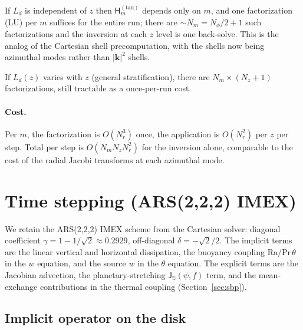 \documentclass[11pt]{article}
\newcommand{\Jsphere}{\mathsf{J}_{\mathbb{S}}}
\newcommand{\Ld}{L_d}
\newcommand{\Ra}{\mathrm{Ra}}
\newcommand{\Pr}{\mathrm{Pr}}
\begin{document}
If $\Ld$ is independent of $z$ then $\mathsf{H}_{m}^{(\mathrm{tau})}$
depends only on $m$, and one factorization (LU) per $m$ suffices for
the entire run; there are $\sim N_{m} = N_{\phi}/2 + 1$ such
factorizations and the inversion at each $z$ level is one back-solve.
This is the analog of the Cartesian shell precomputation, with the
shells now being azimuthal modes rather than $|\bm{k}|^{2}$ shells.

If $\Ld(z)$ varies with $z$ (general stratification), there are
$N_{m} \times (N_{z}+1)$ factorizations, still tractable as a
once-per-run cost.

\paragraph{Cost.}  Per $m$, the factorization is $O(N_{r}^{3})$ once,
the application is $O(N_{r}^{2})$ per $z$ per step.  Total per step
is $O(N_{m} N_{z} N_{r}^{2})$ for the inversion alone, comparable to
the cost of the radial Jacobi transforms at each azimuthal mode.

\section{Time stepping (ARS(2,2,2) IMEX)}

We retain the ARS(2,2,2) IMEX scheme from the Cartesian solver:
diagonal coefficient $\gamma = 1 - 1/\sqrt{2} \approx 0.2929$,
off-diagonal $\delta = -\sqrt{2}/2$.  The implicit terms are the
linear vertical and horizontal dissipation, the buoyancy coupling
$\Ra/\Pr\,\theta$ in the $w$ equation, and the source $w$ in the
$\theta$ equation.  The explicit terms are the Jacobian advection,
the planetary-stretching $\Jsphere(\psi, f)$ term, and the
mean-exchange contributions in the thermal coupling
(Section~\ref{sec:sbp}).

\subsection{Implicit operator on the disk}
\end{document}
